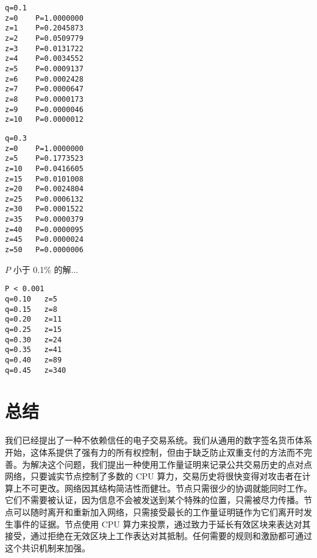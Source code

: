 \documentclass{article}
\begin{document}
\begin{lstlisting}
q=0.1
z=0    P=1.0000000
z=1    P=0.2045873
z=2    P=0.0509779
z=3    P=0.0131722
z=4    P=0.0034552
z=5    P=0.0009137
z=6    P=0.0002428
z=7    P=0.0000647
z=8    P=0.0000173
z=9    P=0.0000046
z=10   P=0.0000012
\end{lstlisting}

\begin{lstlisting}
q=0.3
z=0    P=1.0000000
z=5    P=0.1773523
z=10   P=0.0416605
z=15   P=0.0101008
z=20   P=0.0024804
z=25   P=0.0006132
z=30   P=0.0001522
z=35   P=0.0000379
z=40   P=0.0000095
z=45   P=0.0000024
z=50   P=0.0000006
\end{lstlisting}

$P$ 小于 0.1\% 的解...

\begin{lstlisting}
P < 0.001
q=0.10   z=5
q=0.15   z=8
q=0.20   z=11
q=0.25   z=15
q=0.30   z=24
q=0.35   z=41
q=0.40   z=89
q=0.45   z=340
\end{lstlisting}

\section{总结}

我们已经提出了一种不依赖信任的电子交易系统。我们从通用的数字签名货币体系开始，这体系提供了强有力的所有权控制，但由于缺乏防止双重支付的方法而不完善。为解决这个问题，我们提出一种使用工作量证明来记录公共交易历史的点对点网络，只要诚实节点控制了多数的 CPU 算力，交易历史将很快变得对攻击者在计算上不可更改。网络因其结构简洁性而健壮。节点只需很少的协调就能同时工作。它们不需要被认证，因为信息不会被发送到某个特殊的位置，只需被尽力传播。节点可以随时离开和重新加入网络，只需接受最长的工作量证明链作为它们离开时发生事件的证据。节点使用 CPU 算力来投票，通过致力于延长有效区块来表达对其接受，通过拒绝在无效区块上工作表达对其抵制。任何需要的规则和激励都可通过这个共识机制来加强。


\end{document}
